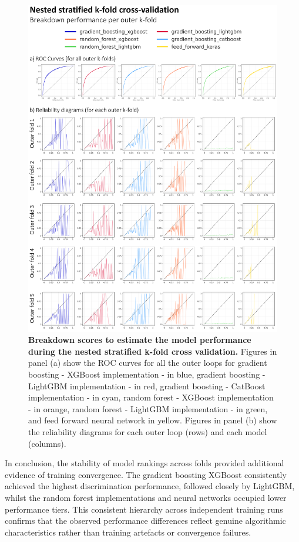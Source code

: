\begin{figure}[htbp]
\centering
\includegraphics[width=\textwidth]{hydro_based_ff_cross_validation_optuna_breakdown_scores.png}
\caption{\textbf{Breakdown scores to estimate the model performance during the nested stratified k-fold cross validation.} Figures in panel (a) show the ROC curves for all the outer loops for gradient boosting - XGBoost implementation - in blue, gradient boosting - LightGBM implementation - in red, gradient boosting - CatBoost implementation - in cyan, random forest - XGBoost implementation - in orange, random forest - LightGBM implementation - in green, and feed forward neural network in yellow. Figures in panel (b) show the reliability diagrams for each outer loop (rows) and each model (columns).}
\label{fig:hydro_based_ff_cross_validation_optuna_breakdown_scores}
\end{figure}

In conclusion, the stability of model rankings across folds provided additional evidence of training convergence. The gradient boosting XGBoost consistently achieved the highest discrimination performance, followed closely by LightGBM, whilst the random forest implementations and neural networks occupied lower performance tiers. This consistent hierarchy across independent training runs confirms that the observed performance differences reflect genuine algorithmic characteristics rather than training artefacts or convergence failures.


